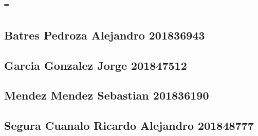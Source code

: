 \hypertarget{index_intro_sec}{}\section{-\/}\label{index_intro_sec}
\hypertarget{index_rralex}{}\subsection{Batres Pedroza Alejandro          201836943}\label{index_rralex}
\hypertarget{index_yorch}{}\subsection{Garcia Gonzalez Jorge             201847512}\label{index_yorch}
\hypertarget{index_sebas}{}\subsection{Mendez Mendez Sebastian           201836190}\label{index_sebas}
\hypertarget{index_yo}{}\subsection{Segura Cuanalo Ricardo Alejandro  201848777}\label{index_yo}
